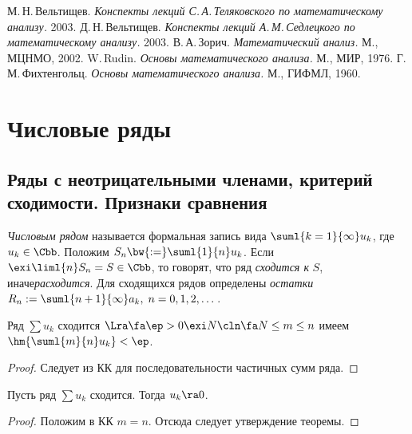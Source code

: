 \documentclass[a4paper]{article}
\begin{document}
\begin{thebibliography}{5}
    \setlength\itemsep{-3pt}
     М.\,Н.\,Вельтищев. \emph{Конспекты лекций С.\,А.\,Теляковского
                                   по математическому анализу.} 2003.
       Д.\,Н.\,Вельтищев. \emph{Конспекты лекций А.\,М.\,Седлецкого
                                   по математическому анализу.} 2003.
                   В.\,А.\,Зорич. \emph{Математический анализ.} М., МЦНМО, 2002.
                    W.\,Rudin. \emph{Основы математического анализа.} М., МИР, 1976.
                     Г.\,М.\,Фихтенгольц. \emph{Основы математического анализа.} М., ГИФМЛ, 1960.
\end{thebibliography}

\pagebreak

\section{Числовые ряды}

\subsection{Ряды с неотрицательными членами, критерий сходимости. Признаки сравнения}

\begin{df}
\emph{Числовым рядом} называется формальная запись вида $\suml{k=1}{\infty} u_k$, где $u_k \in \Cbb$. Положим
$S_n\bw{:=}\suml{1}{n} u_k$. Если $\exi \liml{n} S_n = S \in \Cbb$, то говорят, что ряд \emph{сходится к} $S$,
иначе\т \emph{расходится}. Для сходящихся рядов
определены \emph{остатки} $R_n := \suml{n+1}{\infty} a_k,\; n=0,1,2,\dots$.
\end{df}

\begin{theorem}[КК]
Ряд $\sum u_k$ сходится $\Lra \fa \ep > 0 \exi N\cln \fa N \le m \le n$ имеем
$\hm{\suml{m}{n} u_k} < \ep$.
\end{theorem}
\begin{proof}
Следует из КК для последовательности частичных сумм ряда.
\end{proof}

\begin{theorem}
Пусть ряд $\sum u_k$ сходится. Тогда $u_k \ra 0$.
\end{theorem}
\begin{proof}
Положим в КК $m=n$. Отсюда следует утверждение теоремы.
\end{proof}
\end{document}
